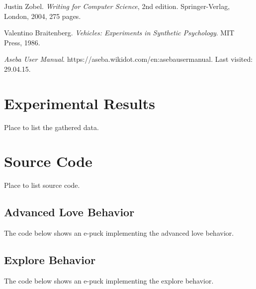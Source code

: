 \documentclass[12pt,a4paper]{article}
\begin{document}
\begin{thebibliography}{20}
Justin Zobel.											%
\textit{Writing for Computer Science}, 2nd edition.		%
Springer-Verlag, London, 2004, 275 pages.				%

Valentino Braitenberg.									%
\textit{Vehicles: Experiments in Synthetic Psychology}.	%
MIT Press, 1986.										%

\textit{Aseba User Manual}.										%
https://aseba.wikidot.com/en:asebausermanual.			%
Last visited: 29.04.15.									%
\end{thebibliography}
\appendix
\renewcommand{\thesection}{Appendix \Alph{section}}
\renewcommand{\thesubsection}{\Alph{section}.\arabic{subsection}}

\clearpage

\section{Experimental Results}
Place to list the gathered data.

\section{Source Code} \label{app:sourceCode}
Place to list source code.

\subsection{Advanced Love Behavior} \label{app:advLove} %
The code below shows an e-puck implementing the advanced love behavior.



\subsection{Explore Behavior} \label{app:expl} %
The code below shows an e-puck implementing the explore behavior.

\end{document}
